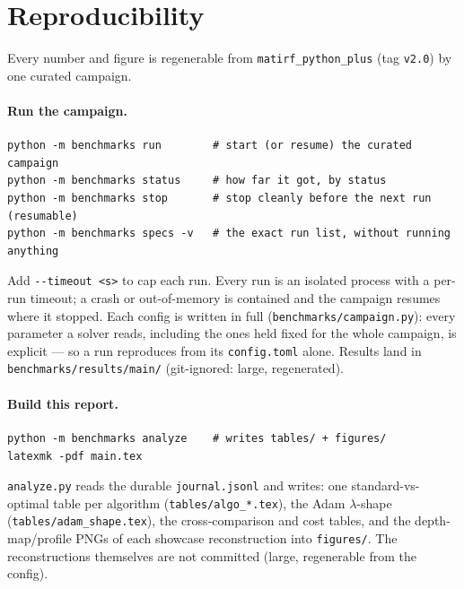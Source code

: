 \section{Reproducibility}
\label{sec:repro}

Every number and figure is regenerable from \texttt{matirf\_python\_plus} (tag \texttt{v2.0}) by
one curated campaign.

\paragraph{Run the campaign.}
\begin{verbatim}
python -m benchmarks run        # start (or resume) the curated campaign
python -m benchmarks status     # how far it got, by status
python -m benchmarks stop       # stop cleanly before the next run (resumable)
python -m benchmarks specs -v   # the exact run list, without running anything
\end{verbatim}
Add \texttt{-{}-timeout <s>} to cap each run. Every run is an isolated process with a per-run
timeout; a crash or out-of-memory is contained and the campaign resumes where it stopped. Each
config is written in full (\texttt{benchmarks/campaign.py}): every parameter a solver reads,
including the ones held fixed for the whole campaign, is explicit --- so a run reproduces from its
\texttt{config.toml} alone. Results land in \texttt{benchmarks/results/main/} (git-ignored: large,
regenerated).

\paragraph{Build this report.}
\begin{verbatim}
python -m benchmarks analyze    # writes tables/ + figures/
latexmk -pdf main.tex
\end{verbatim}
\texttt{analyze.py} reads the durable \texttt{journal.jsonl} and writes: one standard-vs-optimal
table per algorithm (\texttt{tables/algo\_*.tex}), the Adam $\lambda$-shape
(\texttt{tables/adam\_shape.tex}), the cross-comparison and cost tables, and the
depth-map/profile PNGs of each showcase reconstruction into \texttt{figures/}. The
reconstructions themselves are not committed (large, regenerable from the config).
